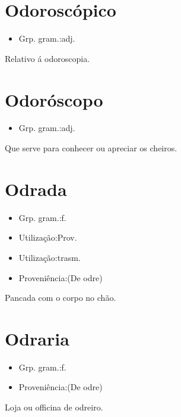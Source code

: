 \section{Odoroscópico}
\begin{itemize}
\item {Grp. gram.:adj.}
\end{itemize}
Relativo á odoroscopia.
\section{Odoróscopo}
\begin{itemize}
\item {Grp. gram.:adj.}
\end{itemize}
Que serve para conhecer ou apreciar os cheiros.
\section{Odrada}
\begin{itemize}
\item {Grp. gram.:f.}
\end{itemize}
\begin{itemize}
\item {Utilização:Prov.}
\end{itemize}
\begin{itemize}
\item {Utilização:trasm.}
\end{itemize}
\begin{itemize}
\item {Proveniência:(De \textunderscore odre\textunderscore )}
\end{itemize}
Pancada com o corpo no chão.
\section{Odraria}
\begin{itemize}
\item {Grp. gram.:f.}
\end{itemize}
\begin{itemize}
\item {Proveniência:(De \textunderscore odre\textunderscore )}
\end{itemize}
Loja ou officina de odreiro.
